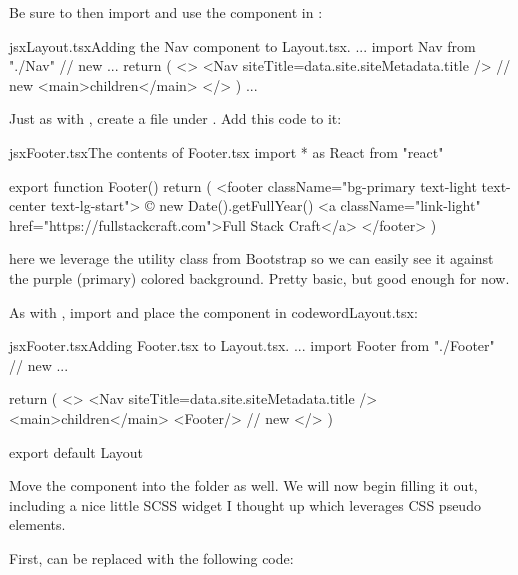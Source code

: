 \documentclass[paper=6in:9in,pagesize=pdftex,headinclude=on,footinclude=on,12pt]{scrbook}
\begin{document}
Be sure to then import and use the  component in :

\begin{codeInput}{jsx}{Layout.tsx}{Adding the Nav component to Layout.tsx.}
...
import { Nav } from "./Nav" // new
...
return (
  <>
    <Nav siteTitle={data.site.siteMetadata.title} /> // new
    <main>{children}</main>
  </>
)
...
\end{codeInput}


Just as with , create a  file under . Add this code to it:

\begin{codeInput}{jsx}{Footer.tsx}{The contents of Footer.tsx}
import * as React from "react"

export function Footer() {
  return (
    <footer className="bg-primary text-light text-center text-lg-start">
      © {new Date().getFullYear()} <a className="link-light" href="https://fullstackcraft.com">Full Stack Craft</a>
    </footer>
  )
}
\end{codeInput}

here we leverage the  utility class from Bootstrap so we can easily see it against the purple (primary) colored background. Pretty basic, but good enough for now.

As with  , import and place the  component in codeword{Layout.tsx}:

\begin{codeInput}{jsx}{Footer.tsx}{Adding Footer.tsx to Layout.tsx.}
...
import { Footer } from "./Footer" // new
...

return (
  <>
    <Nav siteTitle={data.site.siteMetadata.title} />
    <main>{children}</main>
    <Footer/> // new
  </>
)

export default Layout  
\end{codeInput}


Move the  component into the  folder as well. We will now begin filling it out, including a nice little SCSS widget I thought up which leverages CSS pseudo elements.

First,  can be replaced with the following code:
\end{document}
